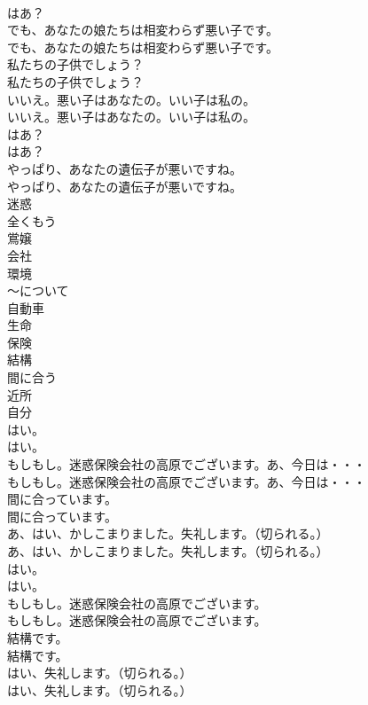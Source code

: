 \documentclass[8pt]{extreport}
\begin{document}
\begin{CJK}{UTF8}{min}
\\	はあ？ 
\\	でも、あなたの娘たちは相変わらず悪い子です。	
\\	でも、あなたの娘たちは相変わらず悪い子です。 
\\	私たちの子供でしょう？	
\\	私たちの子供でしょう？ 
\\	いいえ。悪い子はあなたの。いい子は私の。	
\\	いいえ。悪い子はあなたの。いい子は私の。 
\\	はあ？	
\\	はあ？ 
\\	やっぱり、あなたの遺伝子が悪いですね。	
\\	やっぱり、あなたの遺伝子が悪いですね。 
\\	迷惑
\\	全くもう
\\	鴬嬢
\\	会社
\\	環境
\\	〜について
\\	自動車
\\	生命
\\	保険
\\	結構
\\	間に合う
\\	近所
\\	自分
\\	はい。	
\\	はい。 
\\	もしもし。迷惑保険会社の高原でございます。あ、今日は・・・	
\\	もしもし。迷惑保険会社の高原でございます。あ、今日は・・・ 
\\	間に合っています。	
\\	間に合っています。 
\\	あ、はい、かしこまりました。失礼します。（切られる。）	
\\	あ、はい、かしこまりました。失礼します。（切られる。） 
\\	はい。	
\\	はい。 
\\	もしもし。迷惑保険会社の高原でございます。	
\\	もしもし。迷惑保険会社の高原でございます。 
\\	結構です。	
\\	結構です。 
\\	はい、失礼します。（切られる。）	
\\	はい、失礼します。（切られる。） 

\end{CJK}
\end{document}
